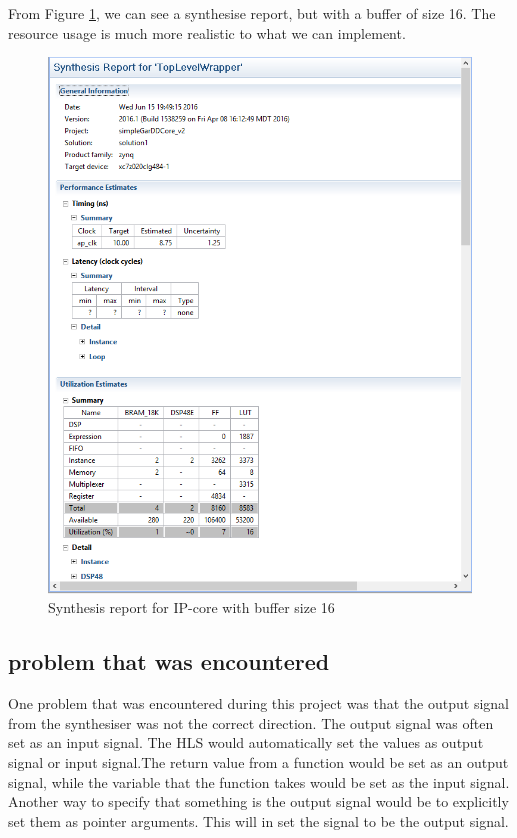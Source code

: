 From Figure \ref{fig:16synth}, we can see a synthesise report, but with a buffer of size 16. The resource usage is much more realistic to what we can implement. 
 \begin{figure}[!ht] \label{fig:16synth}
       \includegraphics[scale=0.6]{Figures/SynthesisReport_16}
    \caption{Synthesis report for IP-core with buffer size 16}
\end{figure}

 
\subsection*{problem that was encountered}
One problem that was encountered during this project was that the output signal from the synthesiser was not the correct direction. The output signal was often set as an input signal. The HLS would automatically set the values as output signal or input signal.The return value from a function would be set as an output signal, while the variable that the function takes would be set as the input signal. Another way to specify that something is the output signal would be to explicitly set them as pointer arguments. This will in set the signal to be the output signal.

